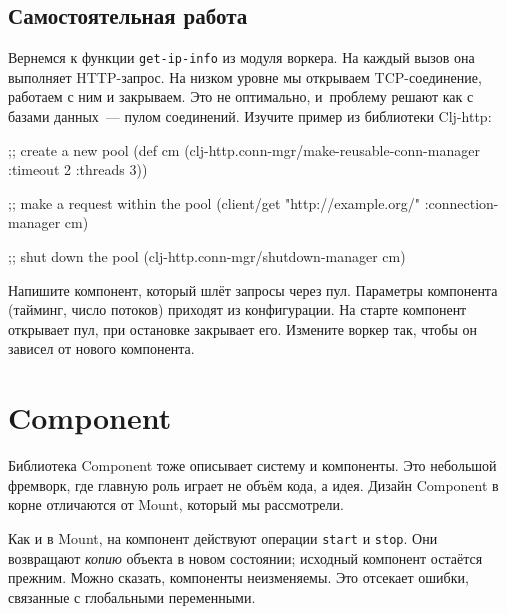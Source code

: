 \subsection{Самостоятельная работа}


Вернемся к функции \verb|get-ip-info| из модуля воркера. На каждый вызов она
выполняет HTTP-запрос. На низком уровне мы открываем TCP-соединение, работаем с
ним и закрываем. Это не оптимально, и~проблему решают как с базами данных~---
пулом соединений. Изучите пример из библиотеки
Clj-http:

\begin{english}
  \begin{clojure}
;; create a new pool
(def cm (clj-http.conn-mgr/make-reusable-conn-manager
         {:timeout 2 :threads 3}))

;; make a request within the pool
(client/get "http://example.org/"
            {:connection-manager cm})

;; shut down the pool
(clj-http.conn-mgr/shutdown-manager cm)
  \end{clojure}
\end{english}


Напишите компонент, который шлёт запросы через пул. Параметры компонента
(тайминг, число потоков) приходят из конфигурации. На старте компонент открывает
пул, при остановке закрывает его. Измените воркер так, чтобы он зависел от
нового компонента.

\section{Component}


Библиотека Component тоже
описывает систему и компоненты. Это небольшой фремворк, где главную роль играет
не объём кода, а идея. Дизайн Component в корне отличаются от Mount, который мы
рассмотрели.


Как и в Mount, на компонент действуют операции \verb|start| и
\verb|stop|. Они возвращают \emph{копию} объекта в новом состоянии; исходный
компонент остаётся прежним. Можно сказать, компоненты неизменяемы. Это отсекает
ошибки, связанные с глобальными переменными.

